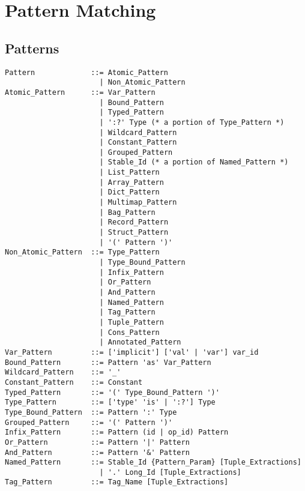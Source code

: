 
\chapter{Pattern Matching}
\label{sec:pattern-matching}

\minitoc

\newpage




\section{Patterns}
\label{sec:patterns}

\grammar\begin{lstlisting}[deletekeywords={as,with}]
Pattern             ::= Atomic_Pattern
                      | Non_Atomic_Pattern
Atomic_Pattern      ::= Var_Pattern
                      | Bound_Pattern
                      | Typed_Pattern
                      | ':?' Type (* a portion of Type_Pattern *)
                      | Wildcard_Pattern
                      | Constant_Pattern
                      | Grouped_Pattern
                      | Stable_Id (* a portion of Named_Pattern *)
                      | List_Pattern
                      | Array_Pattern
                      | Dict_Pattern
                      | Multimap_Pattern
                      | Bag_Pattern
                      | Record_Pattern
                      | Struct_Pattern
                      | '(' Pattern ')'
Non_Atomic_Pattern  ::= Type_Pattern
                      | Type_Bound_Pattern
                      | Infix_Pattern
                      | Or_Pattern
                      | And_Pattern
                      | Named_Pattern
                      | Tag_Pattern
                      | Tuple_Pattern
                      | Cons_Pattern
                      | Annotated_Pattern
Var_Pattern         ::= ['implicit'] ['val' | 'var'] var_id
Bound_Pattern       ::= Pattern 'as' Var_Pattern
Wildcard_Pattern    ::= '_'
Constant_Pattern    ::= Constant
Typed_Pattern       ::= '(' Type_Bound_Pattern ')'
Type_Pattern        ::= ['type' 'is' | ':?'] Type
Type_Bound_Pattern  ::= Pattern ':' Type
Grouped_Pattern     ::= '(' Pattern ')'
Infix_Pattern       ::= Pattern (id | op_id) Pattern
Or_Pattern          ::= Pattern '|' Pattern
And_Pattern         ::= Pattern '&' Pattern
Named_Pattern       ::= Stable_Id {Pattern_Param} [Tuple_Extractions]
                      | '.' Long_Id [Tuple_Extractions]
Tag_Pattern         ::= Tag_Name [Tuple_Extractions]

\end{lstlisting}
